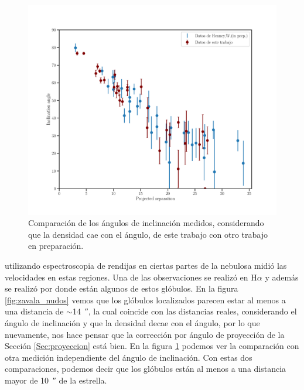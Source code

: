 \documentclass{book}
\begin{document}
\begin{figure}[htb]
    \centering
    \includegraphics[width=\textwidth]{Nuevas imagenes finales/W_1.pdf}
    \caption{Comparación de los ángulos de inclinación medidos, considerando que la densidad cae con el ángulo, de este trabajo con otro trabajo en preparación.}
    \label{fig:ang_Will}
\end{figure}

\cite{Zavala:2022} utilizando espectroscopia de rendijas en ciertas partes de la nebulosa midió las velocidades en estas regiones. Una de las observaciones se realizó en H$\alpha$ y además se realizó por donde están algunos de estos glóbulos. En la figura \ref{fig:zavala_nudos} vemos que los glóbulos localizados parecen estar al menos a una distancia de $\sim$\SI{14}{\arcsecond}, la cual coincide con las distancias reales, considerando el ángulo de inclinación y que la densidad decae con el ángulo, por lo que nuevamente, nos hace pensar que la corrección por ángulo de proyección de la Sección \ref{Sec:proyeccion} está bien. En la figura \ref{fig:ang_Will} podemos ver la comparación con otra medición independiente del ángulo de inclinación. Con estas dos comparaciones, podemos decir que los glóbulos están al menos a una distancia mayor de \SI{10}{\arcsecond} de la estrella. 
\end{document}
